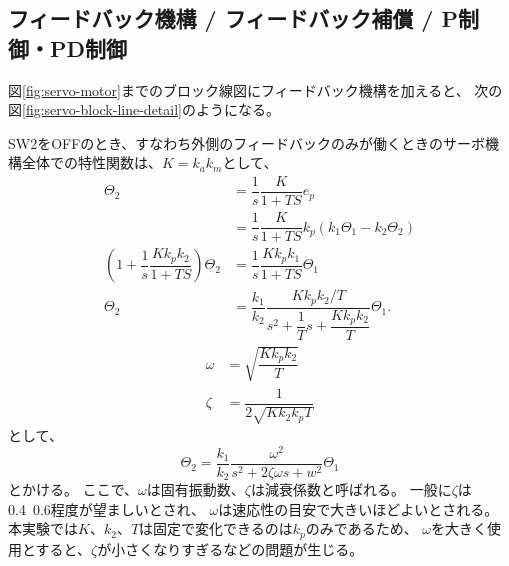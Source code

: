 \documentclass[../../../main]{subfiles}
\begin{document}
\subsection{フィードバック機構 / フィードバック補償 / P制御・PD制御}
図\ref{fig:servo-motor}までのブロック線図にフィードバック機構を加えると、
次の図\ref{fig:servo-block-line-detail}のようになる。


SW2をOFFのとき、すなわち外側のフィードバックのみが働くときのサーボ機構全体での特性関数は、$K=k_a k_m$として、
\begin{align}
	\Theta_2                                                        & = \dfrac{1}{s} \dfrac{K}{1+TS} e_p \nonumber                                                   \\
	                                                                & = \dfrac{1}{s} \dfrac{K}{1+TS} k_p\left( k_1\Theta_1 - k_2 \Theta_2 \right) \nonumber          \\
	\left( 1 + \dfrac{1}{s}\dfrac{K k_p k_2}{1+TS} \right) \Theta_2 & = \dfrac{1}{s} \dfrac{K k_p k_1}{1+TS} \Theta_1 \nonumber                                      \\
	\Theta_2                                                        & = \dfrac{k_1}{k_2} \dfrac{K k_p k_2 / T}{s^2 + \dfrac{1}{T}s +\dfrac{K k_p k_2}{T}} \Theta_1 .
\end{align}
\begin{equation}\label{eq:characteristic-function-parameters}
	\begin{split}
		\omega & = \sqrt{\dfrac{K k_p k_2}{T}}    \\
		\zeta  & = \dfrac{1}{2\sqrt{K k_2 k_p T}}
	\end{split}
\end{equation}
として、
\begin{equation}\label{eq:characteristic-function}
	\Theta_2 = \dfrac{k_1}{k_2} \dfrac{\omega^2}{s^2 + 2\zeta\omega s + w^2} \Theta_1
\end{equation}
とかける。
ここで、$\omega$は固有振動数、$\zeta$は減衰係数と呼ばれる。
一般に$\zeta$は0.4~0.6程度が望ましいとされ、
$\omega$は速応性の目安で大きいほどよいとされる。
本実験では$K$、$k_2$、$T$は固定で変化できるのは$k_p$のみであるため、
$\omega$を大きく使用とすると、$\zeta$が小さくなりすぎるなどの問題が生じる。
\end{document}
